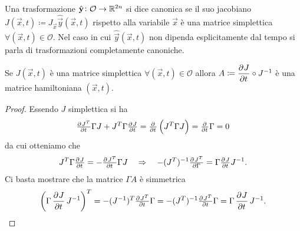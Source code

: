 \begin{definition}
    Una trasformazione $ \hat{\mathbf{y}} \colon \mathcal{O} \to \mathbb{R}^{2n} $ si dice canonica se il suo jacobiano $ J(\vec{x}, t) \coloneqq J_\vec{x} \hat{\vec{y}}(\vec{x}, t) $ rispetto alla variabile $ \vec{x} $ è una matrice simplettica $ \forall (\vec{x}, t) \in \mathcal{O} $. Nel caso in cui $ \hat{\vec{y}}(\vec{x}, t) $ non dipenda esplicitamente dal tempo si parla di trasformazioni completamente canoniche.
\end{definition}

\begin{lemma} \label{lem:jacob-simplettica}
    Se $ J(\vec{x}, t) $ è una matrice simplettica $ \forall (\vec{x}, t) \in \mathcal{O} $ allora $ A \coloneqq \dpd{J}{t} \circ J^{-1} $ è una matrice hamiltoniana $ (\vec{x}, t) $.
\end{lemma}
\begin{proof}
    Essendo $ J $ simplettica si ha
    \[
        \pd{J^T}{t} \Gamma J + J^T \Gamma \pd{J}{t} = \pd{}{t} \left(J^T \Gamma J\right) = \pd{}{t} \Gamma = 0
    \]
    da cui otteniamo che
    \[
        J^T \Gamma \pd{J}{t} = - \pd{J^T}{t} \Gamma J \quad \Rightarrow \quad - (J^T)^{-1} \pd{J^T} \Gamma = \Gamma \pd{J}{t} J^{-1}.
    \]
    Ci basta mostrare che la matrice $ \Gamma A $ è simmetrica
    \[
        \left(\Gamma \dpd{J}{t} J^{-1} \right)^T = - (J^{-1})^T \pd{J^T}{t} \Gamma = - (J^T)^{-1} \pd{J^T}{t} \Gamma = \Gamma \dpd{J}{t} J^{-1}. \qedhere
    \]
\end{proof}

